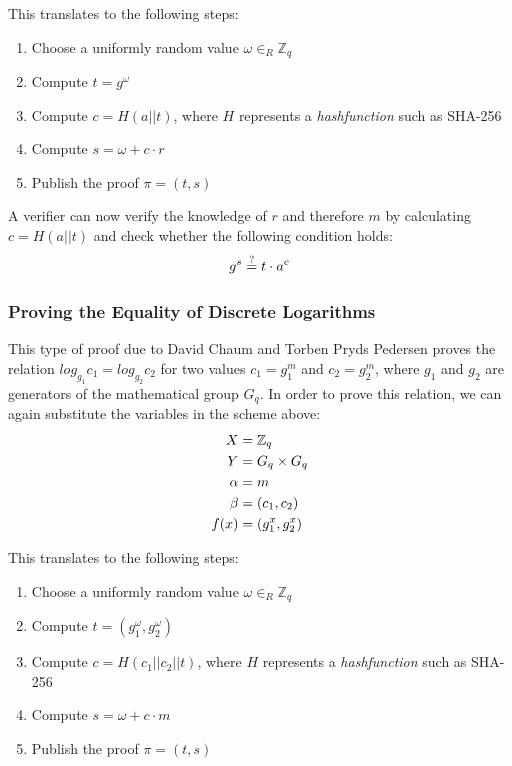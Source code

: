 \documentclass[numbers=noenddot, abstract=on, a4paper, headsepline,
footsepline, oneside, draft=off]{scrreprt}
\begin{document}
This translates to the following steps:

\begin{enumerate}
  \item Choose a uniformly random value $\omega \in_R \mathbb{Z}_q$
  \item Compute $t=g^\omega$
  \item Compute $c=H(a||t)$, where $H$ represents a \emph{hashfunction} such
  as SHA-256
  \item Compute $s=\omega + c \cdot r$
  \item Publish the proof $\pi = (t,s)$
\end{enumerate}

A verifier can now verify the knowledge of $r$ and therefore $m$ by calculating
$c=H(a||t)$ and check whether the following condition holds:
\begin{equation}
	g^s \stackrel{?}{=} t \cdot a^c \notag
\end{equation}

\subsubsection{Proving the Equality of Discrete Logarithms}
\label{sec:proofeqdlog}
This type of proof due to David Chaum and Torben Pryds Pedersen \cite{CP93}
 proves the relation $log_{g_1} c_1 = log_{g_2} c_2 $ for two values $c_1 =
g_1^m$ and $c_2 = g_2^m$, where $g_1$ and $g_2$ are generators of the
mathematical group $G_q$. In order to prove this relation, we can again
substitute the variables in the scheme above:
\begin{align}
  X &= \mathbb{Z}_q \notag \\
  Y &= G_q \times G_q \notag \\
  \alpha &=m \notag \\
  \beta &=(c_1, c_2) \notag \\
  f(x) &= (g_1^x, g_2^x) \notag
\end{align} 

This translates to the following steps:

\begin{enumerate}
  \item Choose a uniformly random value $\omega \in_R \mathbb{Z}_q$
  \item Compute $t=(g_1^\omega, g_2^\omega)$
  \item Compute $c=H(c_1||c_2||t)$, where $H$ represents a
  \emph{hashfunction} such as SHA-256
  \item Compute $s=\omega + c \cdot m$
  \item Publish the proof $\pi = (t,s)$
\end{enumerate}
\end{document}

